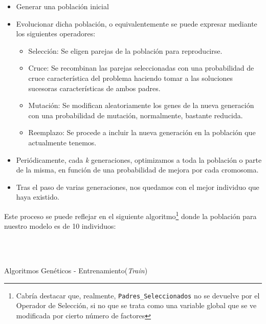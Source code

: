 \documentclass[a4paper, 11pt]{article}
\begin{document}
			\begin{itemize}
				\item Generar una población inicial
				\item Evolucionar dicha población, o equivalentemente se puede expresar mediante los
				siguientes operadores:
					\begin{itemize}
						\item Selección: Se eligen parejas de la población para reproducirse.
						\item Cruce: Se recombinan las parejas seleccionadas con una probabilidad de
						cruce característica del problema haciendo tomar a las soluciones sucesoras
						características de ambos padres.
						\item Mutación: Se modifican aleatoriamente los genes de la nueva generación
						con una probabilidad de mutación, normalmente, bastante reducida.
						\item Reemplazo: Se procede a incluir la nueva generación en la población
						que actualmente tenemos.
					\end{itemize}
				\item Periódicamente, cada \textit{k} generaciones, optimizamos a toda la población o
				parte de la misma, en función de una probabilidad de mejora por cada cromosoma.
				\item Tras el paso de varias generaciones, nos quedamos con el mejor individuo que
				haya existido.
			\end{itemize}
			
			Este proceso se puede reflejar en el siguiente algoritmo\footnote{Cabría destacar que,
			realmente, \texttt{Padres\_Seleccionados} no se devuelve por el Operador de Selección, si
			no que se trata como una variable global que se ve modificada por cierto número de factores}
			donde la población para nuestro modelo es de 10 individuos:
			
			\begin{algorithm}[H]
				\begin{algorithmic}[1]
				\REQUIRE \ \\
				 \
	 
					\ENDIF
				\ENDFOR
				
				
					\ENDFOR
					\ENDIF
				\ENDWHILE
				
				\end{algorithmic}
			\caption{Algoritmos Genéticos - Entrenamiento(\textit{Train})}
			\label{MA-Train}
			\end{algorithm}
			
\end{document}

